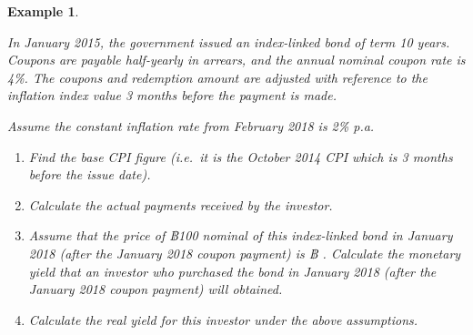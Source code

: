 \documentclass[landscape, 20pt]{extreport}
\theoremstyle{definition}
\theoremstyle{definition}
\newtheorem{example}{Example}[chapter]
\theoremstyle{definition}
\theoremstyle{definition}
\theoremstyle{remark}
\begin{document}
\newpage \begin{example}
\protect\hypertarget{exm:exampleILB2}{}\label{exm:exampleILB2}

\emph{In January 2015, the government issued an
index-linked bond of term 10 years. Coupons are payable half-yearly in
arrears, and the annual nominal coupon rate is 4\%. The coupons and
redemption amount are adjusted with reference to the inflation index
value 3 months before the payment is made.}

\emph{Assume the constant inflation rate from February 2018 is 2\% p.a.}

\begin{enumerate}
\def\labelenumi{\arabic{enumi}.}
\item
  \emph{Find the base CPI figure (i.e.~it is the October 2014 CPI which is
  3 months before the issue date).}
\item
  \emph{Calculate the actual payments received by the investor.}
\item
  \emph{Assume that the price of ฿100 nominal of this index-linked bond in
  January 2018 (after the January 2018 coupon payment) is ฿ .
  Calculate the monetary yield that an investor who purchased the bond
  in January 2018 (after the January 2018 coupon payment) will
  obtained.}
\item
  \emph{Calculate the real yield for this investor under the above
  assumptions.}
\end{enumerate}

\end{example}
\end{document}

